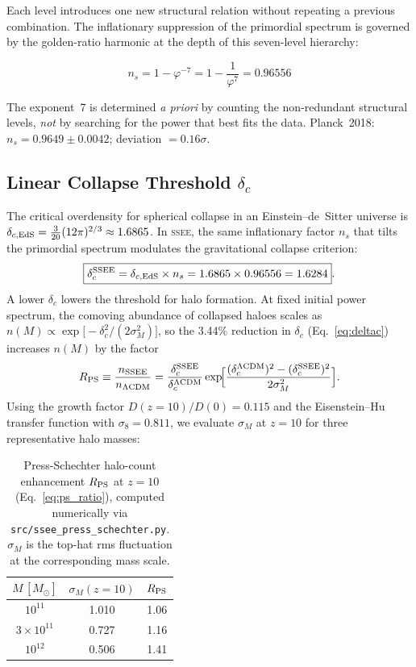 \documentclass[12pt,a4paper]{article}
\newcommand{\SSEE}{\ifmmode\mathrm{SSEE}\else\textsc{ssee}\fi}
\begin{document}
Each level introduces one new structural relation without repeating a
previous combination.
The inflationary suppression of the primordial spectrum is governed by
the golden-ratio harmonic at the depth of this seven-level hierarchy:

\begin{equation}
\boxed{n_s = 1 - \varphi^{-7} = 1 - \frac{1}{\varphi^7} = 0.96556}
\label{eq:ns}
\end{equation}

The exponent~7 is determined \emph{a priori} by counting the non-redundant
structural levels, \emph{not} by searching for the power that best fits
the data.
Planck~2018: $n_s = 0.9649\pm0.0042$; deviation $= 0.16\sigma$.

\subsection{Linear Collapse Threshold $\delta_c$}
\label{sec:deltac}

The critical overdensity for spherical collapse in an Einstein--de~Sitter universe is
$\delta_{c,\rm EdS} = \tfrac{3}{20}(12\pi)^{2/3} \approx 1.6865$.
In \SSEE, the same inflationary factor $n_s$ that tilts the primordial spectrum
modulates the gravitational collapse criterion:
\begin{equation}
\boxed{\delta_c^{\rm SSEE} = \delta_{c,\rm EdS}\times n_s
       = 1.6865\times 0.96556 = 1.6284}.
\label{eq:deltac}
\end{equation}
A lower $\delta_c$ lowers the threshold for halo formation.  At fixed initial
power spectrum, the comoving abundance of collapsed haloes scales as
$n(M) \propto \exp\!\bigl[-\delta_c^2/(2\sigma_M^2)\bigr]$, so the 3.44\%
reduction in $\delta_c$ (Eq.~\ref{eq:deltac}) increases $n(M)$ by the factor
\begin{equation}
  R_{\rm PS} \equiv
  \frac{n_{\rm SSEE}}{n_{\Lambda{\rm CDM}}}
  = \frac{\delta_c^{\rm SSEE}}{\delta_c^{\Lambda{\rm CDM}}}
    \exp\!\Bigl[
      \frac{(\delta_c^{\Lambda{\rm CDM}})^2 - (\delta_c^{\rm SSEE})^2}
           {2\sigma_M^2}
    \Bigr].
  \label{eq:ps_ratio}
\end{equation}
Using the \citet{PlanckCollaboration2020a} growth factor $D(z{=}10)/D(0)=0.115$ and the
Eisenstein--Hu transfer function with $\sigma_8=0.811$, we evaluate
$\sigma_M$ at $z=10$ for three representative halo masses:

\begin{table}[h]
\centering
\caption{Press-Schechter halo-count enhancement $R_{\rm PS}$ at $z=10$
(Eq.~\ref{eq:ps_ratio}), computed numerically via \texttt{src/ssee\_press\_schechter.py}.
$\sigma_M$ is the top-hat rms fluctuation at the corresponding mass scale.}
\label{tab:ps_enhancement}
\begin{tabular}{ccc}
\hline
$M\,[M_\odot]$ & $\sigma_M(z{=}10)$ & $R_{\rm PS}$ \\
\hline
$10^{11}$          & 1.010 & 1.06 \\
$3\times10^{11}$   & 0.727 & 1.16 \\
$10^{12}$          & 0.506 & 1.41 \\
\hline
\end{tabular}
\end{table}
\end{document}
